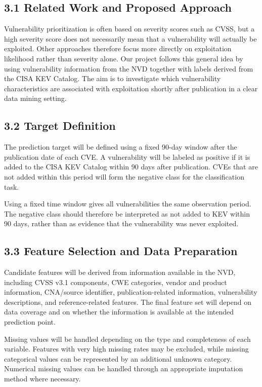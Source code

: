 \documentclass[11pt, a4paper]{article}
\begin{document}
	\subsection*{3.1 Related Work and Proposed Approach}
	Vulnerability prioritization is often based on severity scores such as CVSS, but a high severity score does not necessarily mean that a vulnerability will actually be exploited. Other approaches therefore focus more directly on exploitation likelihood rather than severity alone. Our project follows this general idea by using vulnerability information from the NVD together with labels derived from the CISA KEV Catalog. The aim is to investigate which vulnerability characteristics are associated with exploitation shortly after publication in a clear data mining setting.
	
	\subsection*{3.2 Target Definition}
	The prediction target will be defined using a fixed 90-day window after the publication date of each CVE. A vulnerability will be labeled as positive if it is added to the CISA KEV Catalog within 90 days after publication. CVEs that are not added within this period will form the negative class for the classification task.
	
	Using a fixed time window gives all vulnerabilities the same observation period. The negative class should therefore be interpreted as not added to KEV within 90 days, rather than as evidence that the vulnerability was never exploited.
	
	\subsection*{3.3 Feature Selection and Data Preparation}
	Candidate features will be derived from information available in the NVD, including CVSS v3.1 components, CWE categories, vendor and product information, CNA/source identifier, publication-related information, vulnerability descriptions, and reference-related features. The final feature set will depend on data coverage and on whether the information is available at the intended prediction point.
	
	Missing values will be handled depending on the type and completeness of each variable. Features with very high missing rates may be excluded, while missing categorical values can be represented by an additional unknown category. Numerical missing values can be handled through an appropriate imputation method where necessary.
	
\end{document}
